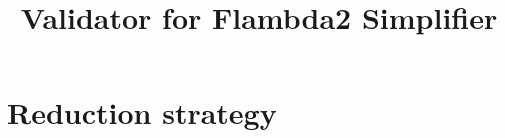 \documentclass[11pt,fleqn]{amsart}
\begin{document}
\title{Validator for Flambda2 Simplifier}
\date{}
\maketitle{}


\section{Reduction strategy}

\newcommand{\letexp}[3]{\mathsf{let}\; #1 \; = \; #2 \; \mathsf{in} \; #3}
\newcommand{\letcodeexp}[3]{\mathsf{let}\; (\mathsf{code} \; #1) \; = \; #2 \; \mathsf{in} \; #3}
\newcommand{\subst}[3]{#1 \; [ #2 \setminus #3 ]}
\newcommand{\letcont}[4]{#1 \; \mathsf{where} \; #2 \; #3 \; = \; #4}
\newcommand{\step}{\longrightarrow}
\newcommand{\applycont}[2]{#1 \; #2}
\newcommand{\apply}[4]{#1 \; \, #2 \; \, #3 \; \, #4}
\newcommand{\abst}[2]{\lambda \; #1.\, #2}
\newcommand{\switch}[2]{\mathsf{switch}\; (#1) \; #2}
\newcommand{\args}[1]{\overrightarrow{#1}}
\end{document}

